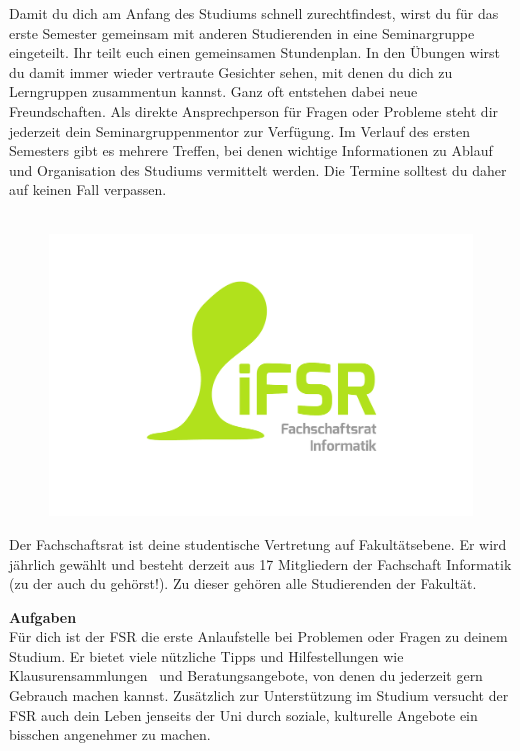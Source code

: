 \pagebreak

\label{sec:seminargruppen}
Damit du dich am Anfang des Studiums schnell zurechtfindest, wirst du für das erste Semester gemeinsam mit anderen Studierenden in eine Seminargruppe eingeteilt.
Ihr teilt euch einen gemeinsamen Stundenplan.
In den Übungen wirst du damit immer wieder vertraute Gesichter sehen, mit denen du dich zu Lerngruppen zusammentun kannst.
Ganz oft entstehen dabei neue Freundschaften.
Als direkte Ansprechperson für Fragen oder Probleme steht dir jederzeit dein Seminargruppenmentor zur Verfügung.
Im Verlauf des ersten Semesters gibt es mehrere Treffen, bei denen wichtige Informationen zu Ablauf und Organisation des Studiums vermittelt werden. Die Termine solltest du daher auf keinen Fall verpassen.


\label{sec:fachschaftsrat}
\begin{figure}\ \\[-1cm]
\flushright\includegraphics[width=\linewidth, trim=160 150 150 50, clip]{img/fsr_logo}
\end{figure}

Der Fachschaftsrat ist deine studentische Vertretung auf Fakultätsebene.
Er wird jährlich gewählt und besteht derzeit aus 17 Mitgliedern der Fachschaft Informatik (zu der auch du gehörst!). Zu dieser gehören alle Studierenden der Fakultät.

\textbf{Aufgaben} \\
Für dich ist der FSR die erste Anlaufstelle bei Problemen oder Fragen zu deinem Studium. Er bietet viele nützliche Tipps und Hilfestellungen wie Klausurensammlungen~ und Beratungsangebote, von denen du jederzeit gern Gebrauch machen kannst. Zusätzlich zur Unterstützung im Studium versucht der FSR auch dein Leben jenseits der Uni durch soziale, kulturelle Angebote ein bisschen angenehmer zu machen.

